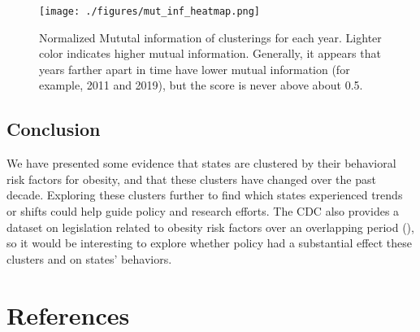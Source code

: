\documentclass[11pt]{article}
\begin{document}
\begin{figure}[hp]
\texttt{[image: ./figures/mut\_inf\_heatmap.png]}
\caption{
  Normalized Mututal information of clusterings for each year. Lighter color indicates higher mutual information. Generally, it appears that years farther apart in time have lower mutual information (for example, 2011 and 2019), but the score is never above about 0.5.
}
\label{fig:mut_inf}
\end{figure}

\subsection{Conclusion}
We have presented some evidence that states are clustered by their behavioral risk factors for obesity, and that these clusters have changed over the past decade. Exploring these clusters further to find which states experienced trends or shifts could help guide policy and research efforts. The CDC also provides a dataset on legislation related to obesity risk factors over an overlapping period (\cite{legislation}), so it would be interesting to explore whether policy had a substantial effect these clusters and on states' behaviors. 
 
\section{References}

 

\end{document}
